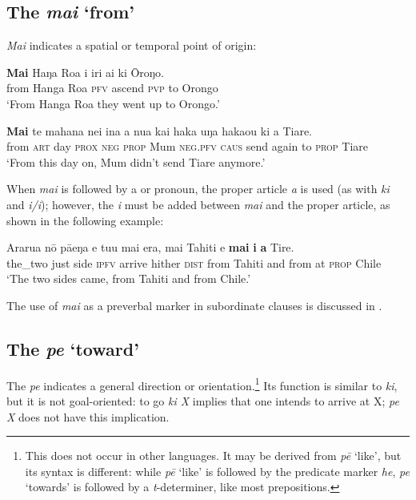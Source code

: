 \subsection{The  \textit{mai} ‘from’}\label{sec:4.7.4}

\textit{Mai} indicates a spatial or temporal point of origin:

\ea\label{ex:4.270}
\gll \textbf{Mai} Haŋa Roa i iri ai ki {\ꞌ}Ōroŋo. \\
from Hanga Roa \textsc{pfv} ascend \textsc{pvp} to Orongo \\

\glt 
‘From Hanga Roa they went up to Orongo.’ \textstyleExampleref{[Ley-2-02.054]}
\z

\ea\label{ex:4.271}
\gll \textbf{Mai} te mahana nei {\ꞌ}ina a nua kai haka uŋa haka{\ꞌ}ou ki a Tiare. \\
from \textsc{art} day \textsc{prox} \textsc{neg} \textsc{prop} Mum \textsc{neg.pfv} \textsc{caus} send again to \textsc{prop} Tiare \\

\glt 
‘From this day on, Mum didn’t send Tiare anymore.’ \textstyleExampleref{[R179.046]} 
\z

When \textit{mai} is followed by a  or pronoun, the proper article \textit{a} is used (as with \textit{ki} and \textit{i/{\ꞌ}i}); however, the  \textit{i} must be added between \textit{mai} and the proper article, as shown in the following example:

\ea\label{ex:4.272}
\gll Ararua nō pā{\ꞌ}eŋa e tu{\ꞌ}u mai era, mai Tahiti {\ꞌ}e \textbf{mai} \textbf{i} \textbf{a} Tire. \\
the\_two just side \textsc{ipfv} arrive hither \textsc{dist} from Tahiti and from at \textsc{prop} Chile \\

\glt 
‘The two sides came, from Tahiti and from Chile.’ \textstyleExampleref{[R539-2.221]}
\z

The use of \textit{mai} as a preverbal marker in subordinate clauses is discussed in .
\subsection{The  \textit{pe} ‘toward’}\label{sec:4.7.5}

The  \textit{pe} indicates a general direction or orientation.\footnote{\label{fn:231}This  does not occur in other languages. It may be derived from \textit{pē} ‘like’, but its syntax is different: while \textit{pē} ‘like’ is followed by the predicate marker \textit{he}, \textit{pe} ‘towards’ is followed by a \textit{t}{}-determiner, like most prepositions.} Its function is similar to \textit{ki}, but it is not goal-oriented: to go \textit{ki X} implies that one intends to arrive at X; \textit{pe X} does not have this implication.

